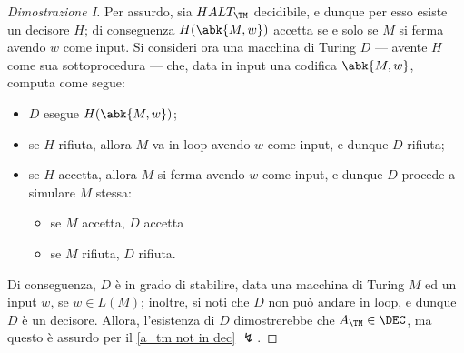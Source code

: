 \documentclass[a4paper, 12pt]{report}
\begin{document}
    \begin{proof}[Dimostrazione I]
        Per assurdo, sia $HALT_\TM$ decidibile, e dunque per esso esiste un decisore $H$; di conseguenza $H(\abk{M, w})$ accetta se e solo se $M$ si ferma avendo $w$ come input. Si consideri ora una macchina di Turing $D$ --- avente $H$ come sua sottoprocedura --- che, data in input una codifica $\abk{M, w}$, computa come segue:

        \begin{itemize}
            \item $D$ esegue $H(\abk{M,w})$;
            \item se $H$ rifiuta, allora $M$ va in loop avendo $w$ come input, e dunque $D$ rifiuta;
            \item se $H$ accetta, allora $M$ si ferma avendo $w$ come input, e dunque $D$ procede a simulare $M$ stessa:
            \begin{itemize}
                \item se $M$ accetta, $D$ accetta
                \item se $M$ rifiuta, $D$ rifiuta.
            \end{itemize}
        \end{itemize}

        Di conseguenza, $D$ è in grado di stabilire, data una macchina di Turing $M$ ed un input $w$, se $w \in L(M)$; inoltre, si noti che $D$ non può andare in loop, e dunque $D$ è un decisore. Allora, l'esistenza di $D$ dimostrerebbe che $A_\TM \in \DEC$, ma questo è assurdo per il \cref{a_tm not in dec} $\lightning$.
    \end{proof}
\end{document}
